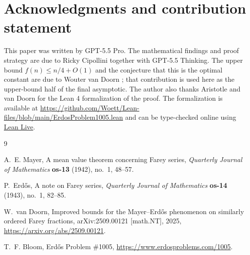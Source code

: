 \documentclass[11pt]{article}
\numberwithin{equation}{section}
\theoremstyle{definition}
\theoremstyle{remark}
\newcommand{\1}{\mathbf 1}
\begin{document}
\section*{Acknowledgments and contribution statement}

This paper was written by GPT-5.5 Pro. The mathematical findings and proof strategy are due to Ricky Cipollini together with GPT-5.5 Thinking.  The upper bound $f(n)\le n/4+O(1)$ and the conjecture that this is the optimal constant are due to Wouter van Doorn \cite{vanDoorn2025}; that contribution is used here as the upper-bound half of the final asymptotic. The author also thanks Aristotle and van Doorn for the Lean 4 formalization of the proof. The formalization is available at \url{https://github.com/Woett/Lean-files/blob/main/ErdosProblem1005.lean} and can be type-checked online using \href{https://live.lean-lang.org/#project=mathlib-v4.28.0&url=https%3A%2F%2Fraw.githubusercontent.com%2FWoett%2FLean-files%2Fmain%2FErdosProblem1005.lean}{Lean Live}.

\begin{thebibliography}{9}

A.~E. Mayer,
\newblock A mean value theorem concerning Farey series,
\newblock \emph{Quarterly Journal of Mathematics} \textbf{os-13} (1942), no.~1, 48--57.

P.~Erdős,
\newblock A note on Farey series,
\newblock \emph{Quarterly Journal of Mathematics} \textbf{os-14} (1943), no.~1, 82--85.

W.~van Doorn,
\newblock Improved bounds for the Mayer--Erdős phenomenon on similarly ordered Farey fractions,
\newblock arXiv:2509.00121 [math.NT], 2025,
\newblock \url{https://arxiv.org/abs/2509.00121}.

T.~F. Bloom,
\newblock Erdős Problem \#1005,
\newblock \url{https://www.erdosproblems.com/1005}.

\end{thebibliography}
\end{document}
